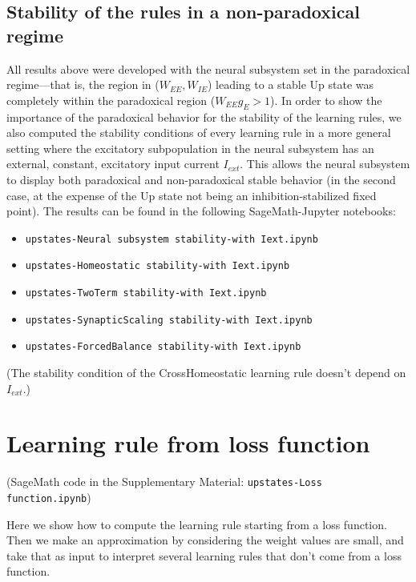 \documentclass[twocolumn]{article}
\newcommand{\EE}{\mathit{EE}}
\newcommand{\IE}{\mathit{IE}}
\newcommand{\ext}{\mathit{ext}}
\begin{document}
\subsection{Stability of the rules in a non-paradoxical regime}
\label{sec.nonparadoxical}

All results above were developed with the neural subsystem set in the paradoxical regime---that is, the region in ($W_{\EE},W_{\IE}$) leading to a stable Up state was completely within the paradoxical region ($W_{\EE}g_E > 1$). In order to show the importance of the paradoxical behavior for the stability of the learning rules, we also computed the stability conditions of every learning rule in a more general setting where the excitatory subpopulation in the neural subsystem has an external, constant, excitatory input current $I_{\ext}$. This allows the neural subsystem to display both paradoxical and non-paradoxical stable behavior (in the second case, at the expense of the Up state not being an inhibition-stabilized fixed point). The results can be found in the following SageMath-Jupyter notebooks:
\begin{itemize}
\item[] {\tt upstates-Neural subsystem stability-with Iext.ipynb}
\item[] {\tt upstates-Homeostatic stability-with Iext.ipynb}
\item[] {\tt upstates-TwoTerm stability-with Iext.ipynb}
\item[] {\tt upstates-SynapticScaling stability-with Iext.ipynb}
\item[] {\tt upstates-ForcedBalance stability-with Iext.ipynb}
\end{itemize}

\noindent (The stability condition of the CrossHomeostatic learning rule doesn't depend on $I_{\ext}$.)



\section{Learning rule from loss function}

(SageMath code in the Supplementary Material: {\tt upstates-Loss function.ipynb})

Here we show how to compute the learning rule starting from a loss function. Then we make an approximation by considering the weight values are small, and take that as input to interpret several learning rules that don't come from a loss function.
\end{document}
